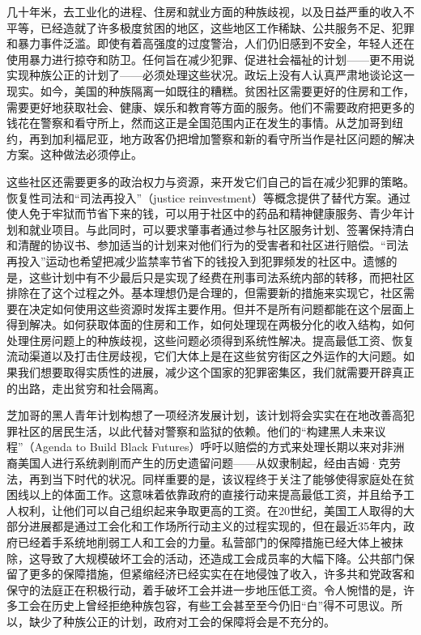\documentclass[fontset=fandol, a4paper, 12pt, openright]{ctexbook}
\begin{document}
几十年米，去工业化的进程、住房和就业方面的种族歧视，以及日益严重的收入不平等，已经造就了许多极度贫困的地区，这些地区工作稀缺、公共服务不足、犯罪和暴力事件泛滥。即使有着高强度的过度警治，人们仍旧感到不安全，年轻人还在使用暴力进行掠夺和防卫。任何旨在减少犯罪、促进社会福祉的计划——更不用说实现种族公正的计划了——必须处理这些状况。政坛上没有人认真严肃地谈论这一现实。如今，美国的种族隔离一如既往的糟糕。贫困社区需要更好的住房和工作，需要更好地获取社会、健康、娱乐和教育等方面的服务。他们不需要政府把更多的钱花在警察和看守所上，然而这正是全国范围内正在发生的事情。从芝加哥到纽约，再到加利福尼亚，地方政客仍把增加警察和新的看守所当作是社区问题的解决方案。这种做法必须停止。

这些社区还需要更多的政治权力与资源，来开发它们自己的旨在减少犯罪的策略。恢复性司法和“司法再投入”（justice reinvestment）等概念提供了替代方案。通过使人免于牢狱而节省下来的钱，可以用于社区中的药品和精神健康服务、青少年计划和就业项目。与此同时，可以要求肇事者通过参与社区服务计划、签署保持清白和清醒的协议书、参加适当的计划来对他们行为的受害者和社区进行赔偿。“司法再投入”运动也希望把减少监禁率节省下的钱投入到犯罪频发的社区中。遗憾的是，这些计划中有不少最后只是实现了经费在刑事司法系统内部的转移，而把社区排除在了这个过程之外。基本理想仍是合理的，但需要新的措施来实现它，社区需要在决定如何使用这些资源时发挥主要作用。但并不是所有问题都能在这个层面上得到解决。如何获取体面的住房和工作，如何处理现在两极分化的收入结构，如何处理住房问题上的种族歧视，这些问题必须得到系统性解决。提高最低工资、恢复流动渠道以及打击住房歧视，它们大体上是在这些贫穷街区之外运作的大问题。如果我们想要取得实质性的进展，减少这个国家的犯罪密集区，我们就需要开辟真正的出路，走出贫穷和社会隔离。

芝加哥的黑人青年计划构想了一项经济发展计划，该计划将会实实在在地改善高犯罪社区的居民生活，以此代替对警察和监狱的依赖。他们的“构建黑人未来议程”（Agenda to Build Black Futures）呼吁以赔偿的方式来处理长期以来对非洲裔美国人进行系统剥削而产生的历史遗留问题——从奴隶制起，经由吉姆·克劳法，再到当下时代的状况。同样重要的是，该议程终于关注了能够使得家庭处在贫困线以上的体面工作。这意味着依靠政府的直接行动来提高最低工资，并且给予工人权利，让他们可以自己组织起来争取更高的工资。在20世纪，美国工人取得的大部分进展都是通过工会化和工作场所行动主义的过程实现的，但在最近35年内，政府已经着手系统地削弱工人和工会的力量。私营部门的保障措施已经大体上被抹除，这导致了大规模破坏工会的活动，还造成工会成员率的大幅下降。公共部门保留了更多的保障措施，但紧缩经济已经实实在在地侵蚀了收入，许多共和党政客和保守的法庭正在积极行动，着手破坏工会并进一步地压低工资。令人惋惜的是，许多工会在历史上曾经拒绝种族包容，有些工会甚至至今仍旧“白”得不可思议。所以，缺少了种族公正的计划，政府对工会的保障将会是不充分的。
\end{document}
